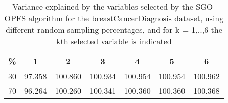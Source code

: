 \begin{table}
	\begin{center}
		\begin{tabular}{c c c c c c c}
			\% & 1 & 2 & 3 & 4 & 5 & 6 \\
			\hline
			30 & 97.358 & 100.860 & 100.934 & 100.954 & 100.954 & 100.962 \\
			70 & 96.264 & 100.260 & 100.341 & 100.360 & 100.360 & 100.368 \\
		\end{tabular}
	\end{center}
	\caption{Variance explained by the variables selected by the SGO-OPFS algorithm for the breastCancerDiagnosis dataset, using different random sampling percentages, and for k = 1,..,6 the kth selected variable is indicated}
\end{table}